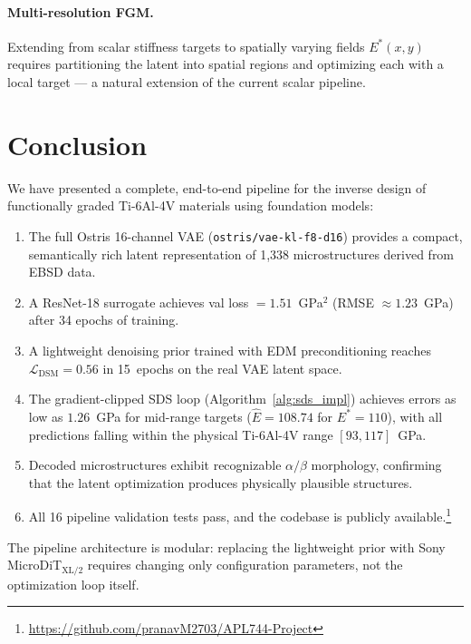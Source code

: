 \documentclass[12pt,a4paper]{article}
\newcommand{\loss}{\mathcal{L}}
\newcommand{\Etar}{E^{*}}
\theoremstyle{definition}
\begin{document}
\paragraph{Multi-resolution FGM.}
Extending from scalar stiffness targets to spatially varying fields
$\Etar(x, y)$ requires partitioning the latent into spatial regions
and optimizing each with a local target — a natural extension of the
current scalar pipeline.

\section{Conclusion}
\label{sec:conclusion}

We have presented a complete, end-to-end pipeline for the inverse design of
functionally graded Ti-6Al-4V materials using foundation models:
\begin{enumerate}[nosep]
  \item The full Ostris 16-channel VAE (\texttt{ostris/vae-kl-f8-d16})
    provides a compact, semantically rich latent representation of
    1{,}338 microstructures derived from EBSD data.
  \item A ResNet-18 surrogate achieves val loss $= 1.51$~GPa$^2$
    (RMSE $\approx 1.23$~GPa) after 34 epochs of training.
  \item A lightweight denoising prior trained with EDM preconditioning
    reaches $\loss_{\mathrm{DSM}} = 0.56$ in 15~epochs on the real
    VAE latent space.
  \item The gradient-clipped SDS loop (Algorithm~\ref{alg:sds_impl})
    achieves errors as low as $1.26$~GPa for mid-range targets
    ($\hat{E} = 108.74$ for $E^* = 110$), with all predictions
    falling within the physical Ti-6Al-4V range $[93, 117]$~GPa.
  \item Decoded microstructures exhibit recognizable $\alpha/\beta$
    morphology, confirming that the latent optimization produces
    physically plausible structures.
  \item All 16 pipeline validation tests pass, and the codebase is
    publicly available.\footnote{\url{https://github.com/pranavM2703/APL744-Project}}
\end{enumerate}

The pipeline architecture is modular: replacing the lightweight prior
with Sony MicroDiT$_{\text{XL/2}}$ requires changing only configuration
parameters, not the optimization loop itself.
\end{document}
